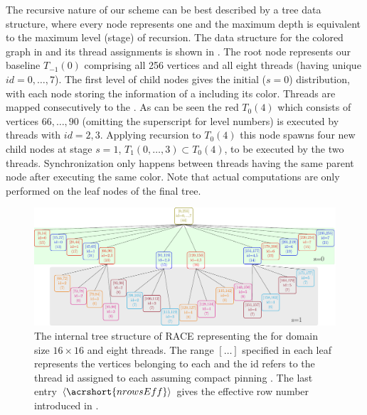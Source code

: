 The recursive nature of our scheme can be best  described by a tree data structure, where every node represents one \levelGroup and  the maximum depth is equivalent to the maximum level (stage) of recursion. The data structure for the colored graph in  and its thread assignments is shown in . The root node represents our baseline \levelGroup $T_{-1}(0)$ comprising all 256 vertices and all eight threads (having unique $id=0,\ldots,7$). The first level of child nodes gives the initial ($s=0$) distribution, with each node storing the information of a \levelGroup including its color. Threads are mapped consecutively to the \levelGroups. As can be seen the red $T_0(4)$ \levelGroup which consists of vertices $66,\ldots,90$ (omitting the superscript for level numbers) is executed by threads with $id=2,3$.  Applying recursion to $T_0(4)$ this node spawns four new child nodes at stage $s =1$, \ie \levelGroups $T_1(0,\ldots,3) \subset T_0(4)$, to be executed by the two threads. Synchronization only happens between threads having the same parent node after executing the same color. Note that actual computations are only performed on the leaf nodes of the final tree.
	 \begin{figure}[t]
		 \includegraphics[width=\textwidth, height=0.2\textheight]{pics/recursion/2d-7pt_example/tree/tree}
	 	\caption{The internal tree structure of \acrshort{RACE} representing the \stex for domain size $16 \times 16$ and eight threads. The range $[\ldots]$ specified in each leaf represents the vertices belonging to each \levelGroup and the id refers to the thread id assigned to each \levelGroup assuming compact pinning . The last entry $\langle\acrshort{nrowsEff}\rangle$ gives the effective row number introduced in  . }
	 	\label{fig:rec_2d-7pt_tree}
	 \end{figure}

